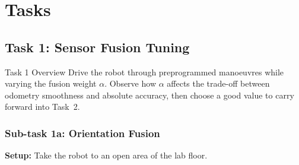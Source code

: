 \documentclass[12pt,letterpaper]{article}
\begin{document}

\newpage

\section{Tasks}



\subsection{Task 1: Sensor Fusion Tuning}

\begin{taskbox}{Task 1 Overview}
  Drive the robot through preprogrammed manoeuvres while varying the
  fusion weight $\alpha$.  Observe how $\alpha$ affects the trade-off between
  odometry smoothness and absolute accuracy, then choose a good value to carry
  forward into Task~2.
\end{taskbox}

\subsubsection{Sub-task 1a: Orientation Fusion}

\textbf{Setup:} Take the robot to an open area of the lab floor.
\end{document}

